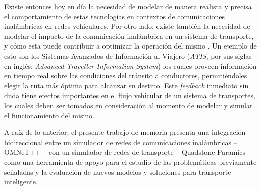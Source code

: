 Existe entonces hoy en día la necesidad de modelar de manera realista y precisa el comportamiento de estas tecnologías en contextos de comunicaciones inalámbricas en redes vehiculares. Por otro lado, existe también la necesidad de modelar el impacto de la comunicación inalámbrica en un sistema de transporte, y cómo esta puede contribuir a optimizar la operación del mismo \cite{bidirectionalsimul}. Un ejemplo de esto son los Sistemas Avanzados de Información al Viajero (\textit{ATIS}, por sus siglas en inglés; \textit{Advanced Traveller Information System}) los cuales proveen información en tiempo real sobre las condiciones del tránsito a conductores, permitiéndoles elegir la ruta más óptima para alcanzar su destino. Este \textit{feedback} inmediato sin duda tiene efectos importantes en el flujo vehicular de un sistema de transportes, los cuales deben ser tomados en consideración al momento de modelar y simular el funcionamiento del mismo.

A raíz de lo anterior, el presente trabajo de memoria presenta una integración bidireccional entre un simulador de redes de comunicaciones inalámbricas -- OMNeT++ -- con un simulador de redes de transporte -- Quadstone Paramics -- como una herramienta de apoyo para el estudio de las problemáticas previamente señaladas y la evaluación de nuevos modelos y soluciones para transporte inteligente.